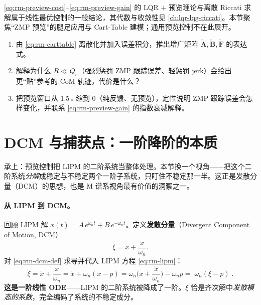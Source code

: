 \begin{note}
\cref{eq:rm-preview-cost}--\cref{eq:rm-preview-gain} 的 LQR $+$ 预览理论与离散 Riccati 求解属于线性最优控制的一般结论，其代数与收敛性见 \cref{ch:lqr-lqg-riccati}。本节聚焦“ZMP 预览”的腿足应用与 Cart-Table 建模；通用预览控制不在此展开。
\end{note}

\begin{exercise}
\begin{enumerate}
  \item 由 \cref{eq:rm-carttable} 离散化并加入误差积分，推出增广矩阵 $\tilde{\mathbf{A}},\tilde{\mathbf{B}},\tilde{\mathbf{F}}$ 的表达式。
  \item 解释为什么 $R\ll Q_e$（强烈惩罚 ZMP 跟踪误差、轻惩罚 jerk）会给出更“贴”参考的 CoM 轨迹，代价是什么？
  \item 把预览窗口从 $1.5$\,s 缩到 $0$（纯反馈、无预览），定性说明 ZMP 跟踪误差会怎样变化，并联系 \cref{eq:rm-preview-gain} 的指数衰减解释。
\end{enumerate}
\end{exercise}

\section{DCM 与捕获点：一阶降阶的本质}
\label{sec:rm-dcm}

承上：预览控制把 LIPM 的二阶系统当整体处理。本节换一个视角——把这个二阶系统\emph{分解}成稳定与不稳定两个一阶子系统，只盯住不稳定那一半。这正是发散分量（DCM）的思想，也是 M 谱系视角最有价值的洞察之一。

\paragraph{从 LIPM 到 DCM。}
回顾 LIPM 解 $x(t)=A\,e^{\omega_n t}+B\,e^{-\omega_n t}$。定义\textbf{发散分量}（Divergent Component of Motion, DCM）
\begin{equation}
  \xi=x+\frac{\dot{x}}{\omega_n}.
  \label{eq:rm-dcm-def}
\end{equation}
对 \cref{eq:rm-dcm-def} 求导并代入 LIPM 方程 \cref{eq:rm-lipm}：
\begin{equation}
  \dot{\xi}=\dot{x}+\frac{\ddot{x}}{\omega_n}=\dot{x}+\omega_n(x-p)
  =\omega_n\Big(x+\frac{\dot{x}}{\omega_n}\Big)-\omega_n p
  =\boxed{\;\omega_n(\xi-p)\;}.
  \label{eq:rm-dcm-dyn}
\end{equation}
\textbf{这是一阶线性 ODE}——LIPM 的二阶系统被降成了一阶。$\xi$ 恰是齐次解中\emph{发散模态的系数}，完全编码了系统的不稳定成分。


